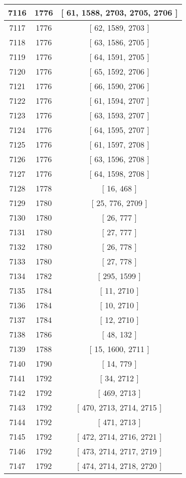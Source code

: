 \begin{center}
\begin{longtable}[H]{|| c c c ||}
7116 & 1776 & [ 61, 1588, 2703, 2705, 2706 ] \\ 
\hline
7117 & 1776 & [ 62, 1589, 2703 ] \\ 
\hline
7118 & 1776 & [ 63, 1586, 2705 ] \\ 
\hline
7119 & 1776 & [ 64, 1591, 2705 ] \\ 
\hline
7120 & 1776 & [ 65, 1592, 2706 ] \\ 
\hline
7121 & 1776 & [ 66, 1590, 2706 ] \\ 
\hline
7122 & 1776 & [ 61, 1594, 2707 ] \\ 
\hline
7123 & 1776 & [ 63, 1593, 2707 ] \\ 
\hline
7124 & 1776 & [ 64, 1595, 2707 ] \\ 
\hline
7125 & 1776 & [ 61, 1597, 2708 ] \\ 
\hline
7126 & 1776 & [ 63, 1596, 2708 ] \\ 
\hline
7127 & 1776 & [ 64, 1598, 2708 ] \\ 
\hline
7128 & 1778 & [ 16, 468 ] \\ 
\hline
7129 & 1780 & [ 25, 776, 2709 ] \\ 
\hline
7130 & 1780 & [ 26, 777 ] \\ 
\hline
7131 & 1780 & [ 27, 777 ] \\ 
\hline
7132 & 1780 & [ 26, 778 ] \\ 
\hline
7133 & 1780 & [ 27, 778 ] \\ 
\hline
7134 & 1782 & [ 295, 1599 ] \\ 
\hline
7135 & 1784 & [ 11, 2710 ] \\ 
\hline
7136 & 1784 & [ 10, 2710 ] \\ 
\hline
7137 & 1784 & [ 12, 2710 ] \\ 
\hline
7138 & 1786 & [ 48, 132 ] \\ 
\hline
7139 & 1788 & [ 15, 1600, 2711 ] \\ 
\hline
7140 & 1790 & [ 14, 779 ] \\ 
\hline
7141 & 1792 & [ 34, 2712 ] \\ 
\hline
7142 & 1792 & [ 469, 2713 ] \\ 
\hline
7143 & 1792 & [ 470, 2713, 2714, 2715 ] \\ 
\hline
7144 & 1792 & [ 471, 2713 ] \\ 
\hline
7145 & 1792 & [ 472, 2714, 2716, 2721 ] \\ 
\hline
7146 & 1792 & [ 473, 2714, 2717, 2719 ] \\ 
\hline
7147 & 1792 & [ 474, 2714, 2718, 2720 ] \\ 

\end{longtable}
\end{center}
